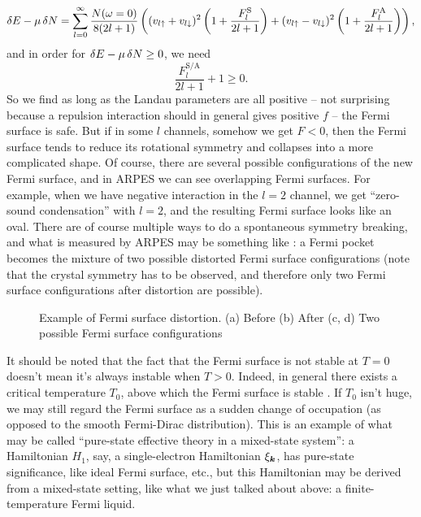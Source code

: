 \documentclass[hyperref, a4paper]{article}
\begin{document}
\begin{equation}
    \var{E} - \mu \var{N} = 
    \sum_{l=0}^{\infty} \frac{N(\omega = 0)}{8 (2 l + 1)}
    \left(
        (v_{l \uparrow} + v_{l \downarrow})^2 \left(
            1 + \frac{F^{\text{S}}_l}{2 l + 1}
        \right)
        + (v_{l \uparrow} - v_{l \downarrow})^2 \left(
            1 + \frac{F^{\text{A}}_l}{2 l + 1}
        \right)
    \right),
\end{equation}
and in order for $\var{E} - \mu \var{N} \geq 0$, we need 
\begin{equation}
    \frac{F^\text{S/A}_l}{2 l + 1} + 1 \geq 0.
\end{equation}
So we find as long as the Landau parameters are all positive -- 
not surprising because a repulsion interaction should in general gives positive $f$ -- 
the Fermi surface is safe.
But if in some $l$ channels, 
somehow we get $F < 0$,
then the Fermi surface tends to reduce its rotational symmetry
and collapses into a more complicated shape.
Of course, there are several possible configurations of 
the new Fermi surface, 
and in ARPES we can see overlapping Fermi surfaces. 
For example, when we have negative interaction in the $l = 2$ channel, 
we get ``zero-sound condensation'' with $l = 2$, 
and the resulting Fermi surface looks like an oval.
There are of course multiple ways to do a spontaneous symmetry breaking, 
and what is measured by ARPES may be something like 
:
a Fermi pocket becomes the mixture of 
two possible distorted Fermi surface configurations
(note that the crystal symmetry has to be observed, 
and therefore only two Fermi surface configurations
after distortion are possible).

\begin{figure}
    \centering
    
    \caption{Example of Fermi surface distortion. (a) Before (b) After
    (c, d) Two possible Fermi surface configurations}
    \label{fig:fermi-surface-distortion}
\end{figure}

It should be noted that the fact that the Fermi surface is not stable at $T = 0$
doesn't mean it's always instable when $T > 0$.
Indeed, in general there exists a critical temperature $T_0$,
above which the Fermi surface is stable \cite{peletminsky1999phase}.
If $T_0$ isn't huge, 
we may still regard the Fermi surface 
as a sudden change of occupation 
(as opposed to the smooth Fermi-Dirac distribution).
This is an example of what may be called 
``pure-state effective theory 
in a mixed-state system'':
a Hamiltonian $H_1$, say, a single-electron Hamiltonian $\xi_{\vb*{k}}$, 
has pure-state significance,
like ideal Fermi surface, etc.,
but this Hamiltonian may be derived from a mixed-state setting,
like what we just talked about above:
a finite-temperature Fermi liquid.
\end{document}
